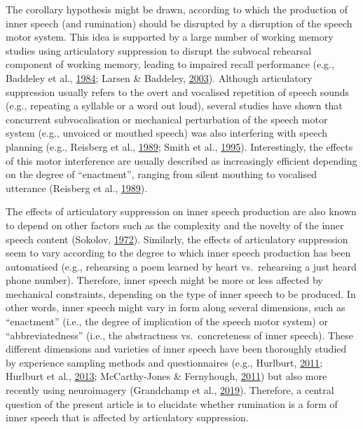 \documentclass[a4paper,12pt,twoside,openright,oldfontcommands]{memoir}
\begin{document}
The corollary hypothesis might be drawn, according to which the production of inner speech (and rumination) should be disrupted by a disruption of the speech motor system. This idea is supported by a large number of working memory studies using articulatory suppression to disrupt the subvocal rehearsal component of working memory, leading to impaired recall performance (e.g., Baddeley et al., \protect\hyperlink{ref-baddeley_exploring_1984}{1984}; Larsen \& Baddeley, \protect\hyperlink{ref-larsen_disruption_2003}{2003}). Although articulatory suppression usually refers to the overt and vocalised repetition of speech sounds (e.g., repeating a syllable or a word out loud), several studies have shown that concurrent subvocalisation or mechanical perturbation of the speech motor system (e.g., unvoiced or mouthed speech) was also interfering with speech planning (e.g., Reisberg et al., \protect\hyperlink{ref-reisberg_enacted_1989}{1989}; Smith et al., \protect\hyperlink{ref-smith_role_1995}{1995}). Interestingly, the effects of this motor interference are usually described as increasingly efficient depending on the degree of \enquote{enactment}, ranging from silent mouthing to vocalised utterance (Reisberg et al., \protect\hyperlink{ref-reisberg_enacted_1989}{1989}).

The effects of articulatory suppression on inner speech production are also known to depend on other factors such as the complexity and the novelty of the inner speech content (Sokolov, \protect\hyperlink{ref-sokolov_inner_1972}{1972}). Similarly, the effects of articulatory suppression seem to vary according to the degree to which inner speech production has been automatised (e.g., rehearsing a poem learned by heart vs.~rehearsing a just heard phone number). Therefore, inner speech might be more or less affected by mechanical constraints, depending on the type of inner speech to be produced. In other words, inner speech might vary in form along several dimensions, such as \enquote{enactment} (i.e., the degree of implication of the speech motor system) or \enquote{abbreviatedness} (i.e., the abstractness vs.~concreteness of inner speech). These different dimensions and varieties of inner speech have been thoroughly studied by experience sampling methods and questionnaires (e.g., Hurlburt, \protect\hyperlink{ref-Hurlburt2011}{2011}; Hurlburt et al., \protect\hyperlink{ref-Hurlburt2013}{2013}; McCarthy-Jones \& Fernyhough, \protect\hyperlink{ref-McCarthy-Jones2011}{2011}) but also more recently using neuroimagery (Grandchamp et al., \protect\hyperlink{ref-grandchamp_neurocognitive_2019}{2019}). Therefore, a central question of the present article is to elucidate whether rumination is a form of inner speech that is affected by articulatory suppression.
\end{document}
